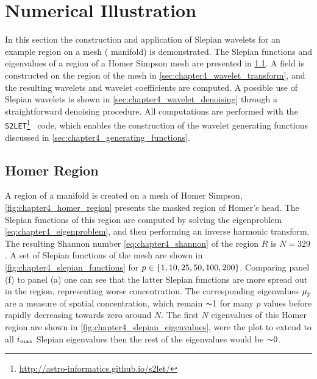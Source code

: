 \section{Numerical Illustration}\label{sec:chapter4_numerical_illustration}

In this section the construction and application of Slepian wavelets for an example region on a mesh (\cf{} manifold) is demonstrated.
The Slepian functions and eigenvalues of a region of a Homer Simpson mesh are presented in \cref{sec:chapter4_homer_region}.
A field is constructed on the region of the mesh in \cref{sec:chapter4_wavelet_transform}, and the resulting wavelets and wavelet coefficients are computed.
A possible use of Slepian wavelets is shown in \cref{sec:chapter4_wavelet_denoising} through a straightforward denoising procedure.
All computations are performed with the \texttt{S2LET}\footnote{\url{http://astro-informatics.github.io/s2let/}}~\cite{Leistedt2013} code, which enables the construction of the wavelet generating functions discussed in \cref{sec:chapter4_generating_functions}.

\subsection{Homer Region}\label{sec:chapter4_homer_region}

A region of a manifold is created on a mesh of Homer Simpson, \cref{fig:chapter4_homer_region} presents the masked region of Homer's head.
The Slepian functions of this region are computed by solving the eigenproblem \cref{eq:chapter4_eigenproblem}, and then performing an inverse harmonic transform.
The resulting Shannon number \cref{eq:chapter4_shannon} of the region \(R\) is \(N=329\).
A set of Slepian functions of the mesh are shown in \cref{fig:chapter4_slepian_functions} for \(p \in \{1, 10, 25, 50, 100, 200\}\).
Comparing panel (f) to panel (a) one can see that the latter Slepian functions are more spread out in the region, representing worse concentration.
The corresponding eigenvalues \({\mu}_{p}\) are a measure of spatial concentration, which remain \({\thicksim}1\) for many \(p\) values before rapidly decreasing towards zero around \(N\).
The first \(N\) eigenvalues of this Homer region are shown in \cref{fig:chapter4_slepian_eigenvalues}, were the plot to extend to all \(i_{\text{max}}{}\) Slepian eigenvalues then the rest of the eigenvalues would be \({\thicksim}0\).





